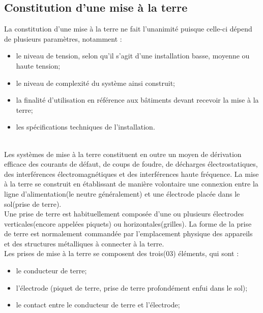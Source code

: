 			\subsection{Constitution d'une mise à la terre}
				La constitution d'une mise à la terre ne fait l'unanimité puisque celle-ci dépend de plusieurs paramètres, notamment :\\
				
				\begin{itemize}
					\begin{itemize}
					\item le niveau de tension, selon qu'il s'agit d'une installation basse, moyenne ou haute tension;
					\item le niveau de complexité du système ainsi construit;
					\item la finalité d'utilisation en référence aux bâtiments devant recevoir la mise à la terre;
					\item les spécifications techniques de l'installation.
					\end{itemize}
				\end{itemize}
\\				
Les systèmes de mise à la terre constituent en outre un moyen de dérivation efficace des courants de défaut, de coups de foudre, de décharges électrostatiques, des interférences électromagnétiques et des interférences haute fréquence. La mise à la terre se construit en établissant de manière volontaire une connexion entre la ligne d'alimentation(le neutre généralement) et une électrode placée dans le sol(prise de terre).\\

Une prise de terre est habituellement composée d'une ou plusieurs électrodes verticales(encore appelées piquets) ou horizontales(grilles). La forme de la prise de terre est normalement commandée par l'emplacement physique des appareils et des structures métalliques à connecter à la terre.\\

Les prises de mise à la terre se composent des trois(03) éléments, qui sont :\\

\begin{itemize}
\item le conducteur de terre;
\item l'électrode (piquet de terre, prise de terre profondément enfui dans le sol);
\item le contact entre le conducteur de terre et l'électrode;
\end{itemize}


